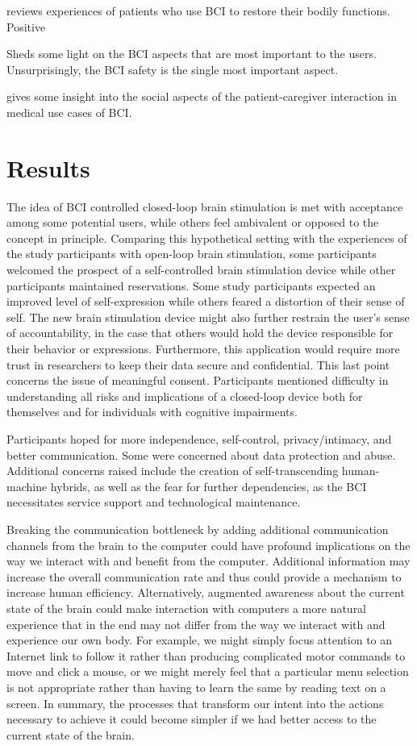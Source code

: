 \documentclass[fleqn,11pt]{olplainarticle}
\begin{document}
\cite{kogel2020like} reviews experiences of patients who use BCI to restore their bodily functions. Positive

\cite{kawala2021summary} Sheds some light on the BCI aspects that are most important to the users. Unsurprisingly, the BCI safety is the single most important aspect.

gives some insight into the social aspects of the patient-caregiver interaction in medical use cases of BCI.

\section{Results}
\label{sec:results}
The idea of BCI controlled closed-loop brain stimulation is met with acceptance among some potential users, while others feel ambivalent or opposed to the concept in principle. Comparing this hypothetical setting with the experiences of the study participants with open-loop brain stimulation, some participants welcomed the prospect of a self-controlled brain stimulation device while other participants maintained reservations. Some study participants expected an improved level of self-expression while others feared a distortion of their sense of self. The new brain stimulation device might also further restrain the user’s sense of accountability, in the case that others would hold the device responsible for their behavior or expressions. Furthermore, this application would require more trust in researchers to keep their data secure and confidential. This last point concerns the issue of meaningful consent. Participants mentioned difficulty in understanding all risks and implications of a closed-loop device both for themselves and for individuals with cognitive impairments. \cite{kogel2019using}

Participants hoped for more independence, self-control, privacy/intimacy, and better communication. Some were concerned about data protection and abuse. Additional concerns raised include the creation of self-transcending human-machine hybrids, as well as the fear for further dependencies, as the BCI necessitates service support and technological maintenance. \cite{kogel2019using}

Breaking the communication bottleneck by adding additional communication channels from the brain to the computer could have profound implications on the way we interact with and benefit from the computer. Additional information may increase the overall communication rate and thus could provide a mechanism to increase human efficiency. Alternatively, augmented awareness about the current state of the brain could make interaction with computers a more natural experience that in the end may not differ from the way we interact with and experience our own body. For example, we might simply focus attention to an Internet link to follow it rather than producing complicated motor commands to move and click a mouse, or we might merely feel that a particular menu selection is not appropriate rather than having to learn the same by reading text on a screen. In summary, the processes that transform our intent into the actions necessary to achieve it could become simpler if we had better access to the current state of the brain. \cite{schalk2008brain}
\end{document}
